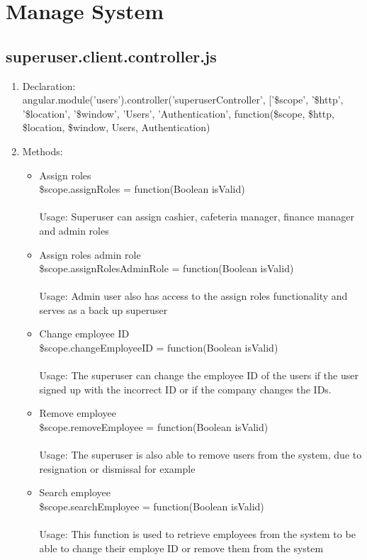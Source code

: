 \documentclass[a4paper,12pt]{article}
\begin{document}
\section{Manage System}
\subsection{superuser.client.controller.js}
\begin{enumerate}
\item Declaration: \\ angular.module('users').controller('superuserController', ['\$scope', '\$http', '\$location', '\$window', 'Users', 'Authentication',
	function(\$scope, \$http, \$location, \$window, Users, Authentication) 
\item Methods: 
	\begin{itemize}
		\item Assign roles \\ \$scope.assignRoles = function(Boolean isValid)  \\ \\
		Usage: Superuser can assign cashier, cafeteria manager, finance manager and admin roles
		\item Assign roles admin role \\ \$scope.assignRolesAdminRole = function(Boolean isValid)   \\ \\
		Usage: Admin user also has access to the assign roles functionality and serves as a back up superuser
		\item Change employee ID \\ \$scope.changeEmployeeID = function(Boolean isValid)  \\ \\
		Usage: The superuser can change the employee ID of the users if the user signed up with the incorrect ID or if the company changes the IDs.
		\item Remove employee \\ \$scope.removeEmployee = function(Boolean isValid)  
		\\ \\ Usage: The superuser is also able to remove users from the system, due to resignation or dismissal for example
		\item Search employee \\ \$scope.searchEmployee = function(Boolean isValid) 
		\\ \\ Usage: This function is used to retrieve employees from the system to be able to change their employe ID or remove them from the system

\end{itemize}
\end{enumerate}
\end{document}

